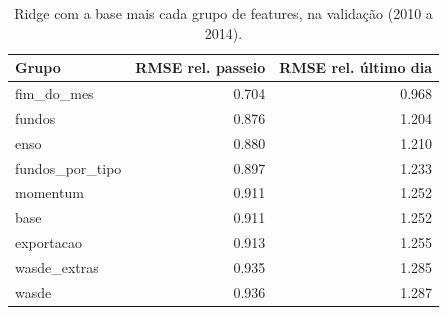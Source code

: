 \begin{table}
\caption{Ridge com a base mais cada grupo de features, na validação (2010 a 2014).}
\label{tab:tab3_grupos}
\begin{tabular}{lrr}
\toprule
Grupo & RMSE rel. passeio & RMSE rel. último dia \\
\midrule
fim\_do\_mes & 0.704 & 0.968 \\
fundos & 0.876 & 1.204 \\
enso & 0.880 & 1.210 \\
fundos\_por\_tipo & 0.897 & 1.233 \\
momentum & 0.911 & 1.252 \\
base & 0.911 & 1.252 \\
exportacao & 0.913 & 1.255 \\
wasde\_extras & 0.935 & 1.285 \\
wasde & 0.936 & 1.287 \\
\bottomrule
\end{tabular}
\end{table}
